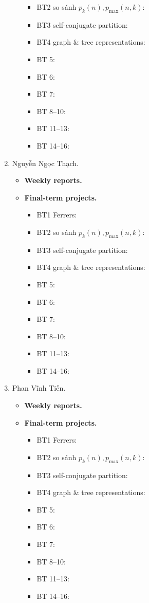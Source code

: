 \documentclass{article}
\begin{document}
\begin{enumerate}
\begin{itemize}
\begin{itemize}
            \item BT2 so sánh $p_k(n),p_{\max}(n,k)$:
            \item BT3 self-conjugate partition:
            \item BT4 graph \& tree representations:
            \item BT 5:
            \item BT 6:
            \item BT 7:
            \item BT 8--10:
            \item BT 11--13:
            \item BT 14--16:
        \end{itemize}
    \end{itemize}
    \item {\sc Nguyễn Ngọc Thạch.}
    \begin{itemize}
        \item {\bf Weekly reports.}
        \item {\bf Final-term projects.}
        \begin{itemize}
            \item BT1 Ferrers:
            \item BT2 so sánh $p_k(n),p_{\max}(n,k)$:
            \item BT3 self-conjugate partition:
            \item BT4 graph \& tree representations:
            \item BT 5:
            \item BT 6:
            \item BT 7:
            \item BT 8--10:
            \item BT 11--13:
            \item BT 14--16:
        \end{itemize}
    \end{itemize}
    \item {\sc Phan Vĩnh Tiến.}
    \begin{itemize}
        \item {\bf Weekly reports.}
        \item {\bf Final-term projects.}
        \begin{itemize}
            \item BT1 Ferrers:
            \item BT2 so sánh $p_k(n),p_{\max}(n,k)$:
            \item BT3 self-conjugate partition:
            \item BT4 graph \& tree representations:
            \item BT 5:
            \item BT 6:
            \item BT 7:
            \item BT 8--10:
            \item BT 11--13:
            \item BT 14--16:
        \end{itemize}
    \end{itemize}
\end{enumerate}
\end{document}

